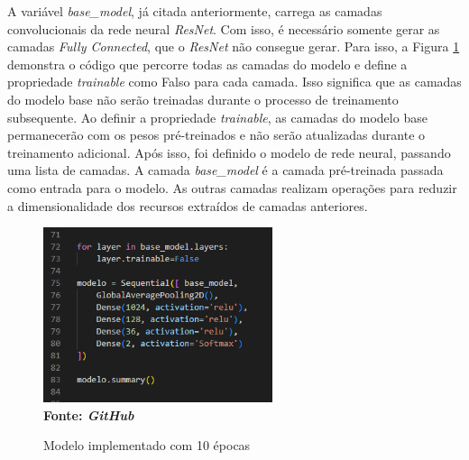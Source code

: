 A variável \textit{base\_model}, já citada anteriormente, carrega as camadas convolucionais da rede neural \textit{ResNet}. Com isso, é necessário somente gerar as camadas \textit{Fully Connected}, que o \textit{ResNet} não consegue gerar. Para isso, a Figura \ref{fig:model} demonstra o código que percorre todas as camadas do modelo e define a propriedade \textit{trainable} como Falso para cada camada. Isso significa que as camadas do modelo base não serão treinadas durante o processo de treinamento subsequente. Ao definir a propriedade \textit{trainable}, as camadas do modelo base permanecerão com os pesos pré-treinados e não serão atualizadas durante o treinamento adicional. Após isso, foi definido o modelo de rede neural, passando uma lista de camadas. A camada \textit{base\_model} é a camada pré-treinada passada como entrada para o modelo. As outras camadas realizam operações para reduzir a dimensionalidade dos recursos extraídos de camadas anteriores.

\begin{figure}[ht]
 	\centering	
 	\caption[\hspace{0.1cm}Grade Computacional.]{Modelo implementado com 10 épocas}
 	\vspace{-0.4cm}
 	\includegraphics[width=0.6\textwidth]{figuras/model.png}
 	\captionsetup{justification=centering}
	\vspace{-0.2cm}
     \\\textbf{\footnotesize Fonte: \textit{GitHub}}
	\label{fig:model}
\end{figure}

